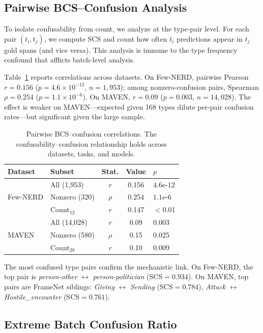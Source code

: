 \documentclass[11pt,a4paper]{article}
\begin{document}
\subsection{Pairwise BCS--Confusion Analysis}

To isolate confusability from count, we analyze at the type-pair level. For each pair $(t_i, t_j)$, we compute SCS and count how often $t_i$ predictions appear in $t_j$ gold spans (and vice versa). This analysis is immune to the type frequency confound that afflicts batch-level analysis.

Table~\ref{tab:pairwise} reports correlations across datasets. On Few-NERD, pairwise Pearson $r=0.156$ ($p=4.6 \times 10^{-12}$, $n=1{,}953$); among nonzero-confusion pairs, Spearman $\rho=0.254$ ($p=1.1 \times 10^{-6}$). On MAVEN, $r=0.09$ ($p=0.003$, $n=14{,}028$). The effect is weaker on MAVEN---expected given 168 types dilute per-pair confusion rates---but significant given the large sample.

\begin{table}[t]
\centering
\small
\caption{Pairwise BCS--confusion correlations. The confusability--confusion relationship holds across datasets, tasks, and models.}
\label{tab:pairwise}
\begin{tabular}{llccl}
\toprule
Dataset & Subset & Stat. & Value & $p$ \\
\midrule
\multirow{3}{*}{Few-NERD} & All (1,953) & $r$ & 0.156 & $4.6\text{e-}12$ \\
 & Nonzero (320) & $\rho$ & 0.254 & $1.1\text{e-}6$ \\
 & Count$_{12}$ & $r$ & 0.147 & $<$0.01 \\
\midrule
\multirow{3}{*}{MAVEN} & All (14,028) & $r$ & 0.09 & 0.003 \\
 & Nonzero (580) & $\rho$ & 0.15 & 0.025 \\
 & Count$_{28}$ & $r$ & 0.10 & 0.009 \\
\bottomrule
\end{tabular}
\end{table}

The most confused type pairs confirm the mechanistic link. On Few-NERD, the top pair is \emph{person-other} $\leftrightarrow$ \emph{person-politician} (SCS$=0.934$). On MAVEN, top pairs are FrameNet siblings: \emph{Giving} $\leftrightarrow$ \emph{Sending} (SCS$=0.784$), \emph{Attack} $\leftrightarrow$ \emph{Hostile\_encounter} (SCS$=0.761$).

\subsection{Extreme Batch Confusion Ratio}
\end{document}
